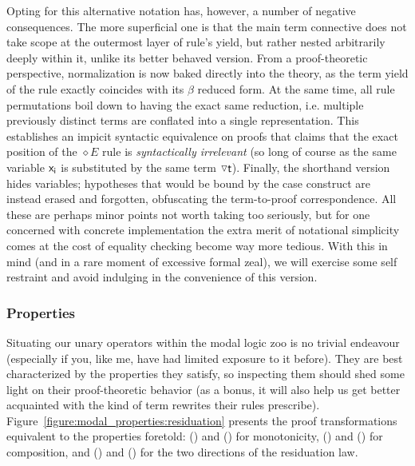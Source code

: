 Opting for this alternative notation has, however, a number of negative consequences.
The more superficial one is that the main term connective does not take scope at the outermost layer of rule's yield, but rather nested arbitrarily deeply within it, unlike its better behaved version.
From a proof-theoretic perspective, normalization is now baked directly into the theory, as the term yield of the rule exactly coincides with its $\beta$ reduced form.
At the same time, all rule permutations boil down to having the exact same reduction, i.e. multiple previously distinct terms are conflated into a single representation.
This establishes an impicit syntactic equivalence on proofs that claims that the exact position of the $\diamond E$ rule is \textit{syntactically irrelevant} (so long of course as the same variable $\mathsf{x_i}$ is substituted by the same term $\smallterm{\diaelim t}$).
Finally, the shorthand version hides variables; hypotheses that would be bound by the case construct are instead erased and forgotten, obfuscating the term-to-proof correspondence.
All these are perhaps minor points not worth taking too seriously, but for one concerned with concrete implementation the extra merit of notational simplicity comes at the cost of equality checking become way more tedious.
With this in mind (and in a rare moment of excessive formal zeal), we will exercise some self restraint and avoid indulging in the convenience of this version.

\subsubsection{Properties}
Situating our unary operators within the modal logic zoo is no trivial endeavour (especially if you, like me, have had limited exposure to it before).
They are best characterized by the properties they satisfy, so inspecting them should shed some light on their proof-theoretic behavior (as a bonus, it will also help us get better acquainted with the kind of term rewrites their rules prescribe).
Figure~\ref{figure:modal_properties:residuation} presents the proof transformations equivalent to the properties foretold:
 () and () for monotonicity, () and () for composition, and () and () for the two directions of the residuation law.
 
